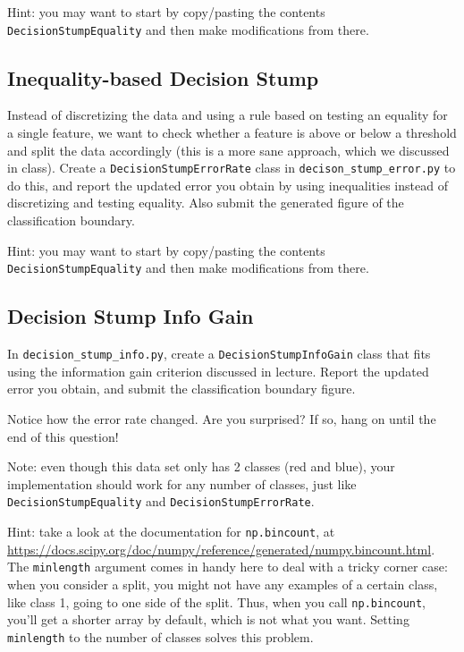 \documentclass{article}
\def\blu#1{{\color{blu}#1}}
\begin{document}
Hint: you may want to start by copy/pasting the contents \texttt{DecisionStumpEquality} and then make modifications from there. 


\subsection{Inequality-based Decision Stump}

Instead of discretizing the data and using a rule based on testing an equality for 
a single feature, we want to check whether a feature is above or below a threshold and 
split the data accordingly (this is a more sane approach, which we discussed in class). 
\blu{Create a \texttt{DecisionStumpErrorRate} class in \texttt{decison\_stump\_error.py} to do this, and report the updated error you 
obtain by using inequalities instead of discretizing and testing equality. Also submit the generated figure of the classification boundary.}

Hint: you may want to start by copy/pasting the contents \texttt{DecisionStumpEquality} and then make modifications from there. 


\subsection{Decision Stump Info Gain}

In \texttt{decision\_stump\_info.py}, \blu{create a \texttt{DecisionStumpInfoGain} class that 
fits using the information gain criterion discussed in lecture. Report the updated error you obtain, and submit the classification boundary figure.}

Notice how the error rate changed. Are you surprised? If so, hang on until the end of this question!

Note: even though this data set only has 2 classes (red and blue), your implementation should work 
for any number of classes, just like \texttt{DecisionStumpEquality} and \texttt{DecisionStumpErrorRate}.

Hint: take a look at the documentation for \texttt{np.bincount}, at \\
\url{https://docs.scipy.org/doc/numpy/reference/generated/numpy.bincount.html}. 
The \texttt{minlength} argument comes in handy here to deal with a tricky corner case:
when you consider a split, you might not have any examples of a certain class, like class 1,
going to one side of the split. Thus, when you call \texttt{np.bincount}, you'll get
a shorter array by default, which is not what you want. Setting \texttt{minlength} to the 
number of classes solves this problem.
\end{document}
